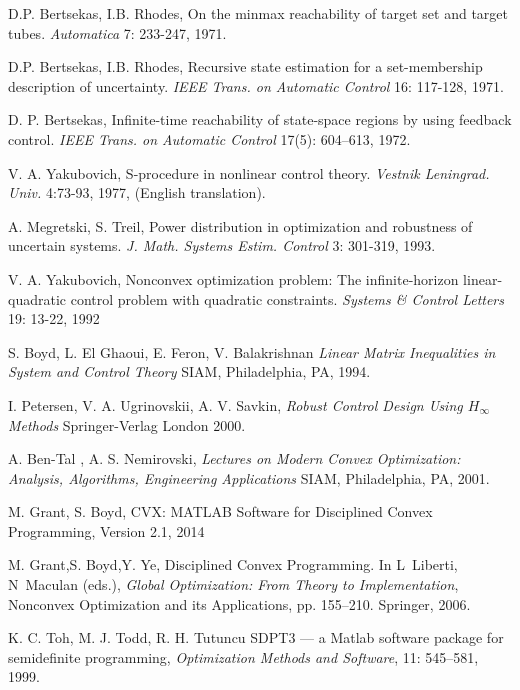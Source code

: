 \documentclass[letterpaper,11pt]{article}
\begin{document}
\begin{thebibliography}{1}
D.P. Bertsekas, I.B. Rhodes,  
On the minmax reachability of target set and target tubes.
{\it Automatica} 7: 233-247, 1971.

D.P. Bertsekas, I.B. Rhodes,  
Recursive state estimation for a set-membership description of uncertainty.
{\it IEEE Trans. on Automatic Control} 16: 117-128, 1971.

D. P. Bertsekas, 
Infinite-time reachability of state-space regions by using feedback control.
{\it IEEE Trans. on Automatic Control} 17(5): 604--613, 1972.

V. A. Yakubovich, 
S-procedure in nonlinear control theory.
{\it Vestnik Leningrad. Univ. } 4:73-93, 1977, (English translation).

A. Megretski, S. Treil, 
Power distribution in optimization and robustness of uncertain systems.
{\it J. Math. Systems Estim. Control }  3: 301-319, 1993. 

V. A. Yakubovich, 
Nonconvex optimization problem: The
infinite-horizon linear-quadratic control
problem with quadratic constraints. 
{\it Systems \& Control Letters } 19: 13-22, 1992

S. Boyd, L. El Ghaoui, E. Feron,  V. Balakrishnan
{ \it Linear Matrix Inequalities in System and Control Theory} 
SIAM, Philadelphia, PA, 1994.

I. Petersen,
V. A. Ugrinovskii,
A. V. Savkin,
{ \it Robust Control Design Using $H_{\infty}$  Methods} 
Springer-Verlag London 2000.

A. Ben-Tal , A. S. Nemirovski,    
{\it Lectures on Modern Convex Optimization: Analysis, Algorithms, Engineering Applications }   
SIAM, Philadelphia, PA, 2001.


M. Grant, S. Boyd,
CVX: MATLAB Software for Disciplined Convex Programming, Version 2.1, 2014  

M. Grant,S. Boyd,Y. Ye, 
Disciplined Convex Programming.
In L~Liberti, N~Maculan (eds.), \emph{Global Optimization: From
	Theory to Implementation}, Nonconvex Optimization and its Applications, pp.
155--210. Springer, 2006.


K. C. Toh, M. J. Todd, R. H. Tutuncu 
SDPT3 --- a Matlab software package for semidefinite programming, {\it Optimization Methods and Software}, 11: 545--581, 1999.

 


\end{thebibliography}
\end{document}
